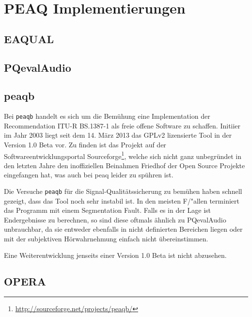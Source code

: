 \chapter{PEAQ Implementierungen}
\label{ch:peaq}

\section{EAQUAL}

\section{PQevalAudio}

\section{peaqb}

Bei \texttt{peaqb} handelt es sich um die Bemühung eine Implementation der Recommendation ITU-R BS.1387-1 als freie offene Software zu schaffen. Initiier im Jahr 2003 liegt seit dem 14. März 2013 das GPLv2 lizensierte Tool in der Version 1.0 Beta vor. Zu finden ist das Projekt auf der Softwareentwicklungsportal Sourceforge\footnote{\url{http://sourceforge.net/projects/peaqb/}}, welche sich nicht ganz unbegr\"undet in den letzten Jahre den inoffiziellen Beinahmen \glqq Friedhof der Open Source Projekte\grqq{} eingefangen hat, was auch bei peaq leider zu spühren ist. 

Die Versuche \texttt{peaqb} für die Signal-Qualitätssicherung zu bem\"uhen haben schnell gezeigt, dass das Tool noch sehr instabil ist. In den meisten F/"allen terminiert das Programm mit einem Segmentation Fault. Falls es in der Lage ist Endergebnisse zu berechnen, so sind diese oftmals ähnlich zu PQevalAudio unbrauchbar, da sie entweder ebenfalls in nicht definierten Bereichen liegen oder mit der subjektiven H\"orwahrnehmung einfach nicht \"ubereinstimmen. 

Eine Weiterentwicklung jenseits einer Version 1.0 Beta ist nicht abzusehen. 

\section{OPERA}





